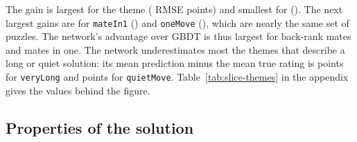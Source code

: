 \documentclass[11pt]{article}
\begin{document}
The gain is largest for the theme
\texttt{}
( RMSE points) and smallest for
\texttt{} ().
The next largest gains are for \texttt{mateIn1}
() and \texttt{oneMove}
(), which are nearly the same set of puzzles.
The network's advantage over GBDT is thus largest for back-rank mates and
mates in one. The network underestimates most the themes that describe a long or quiet
solution: its mean prediction minus the mean true rating is
 points for \texttt{veryLong} and
 points for \texttt{quietMove}.
Table~\ref{tab:slice-themes} in the appendix gives the values behind the
figure.

\subsection{Properties of the solution}
\end{document}
